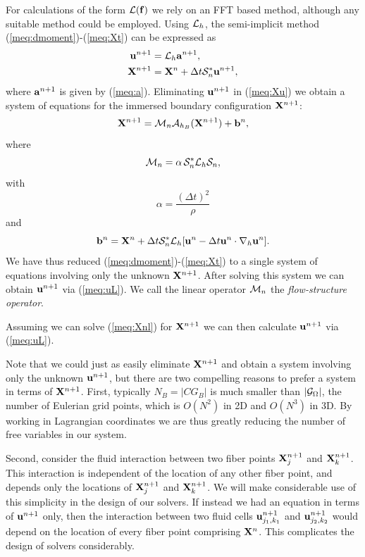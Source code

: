 For calculations of the form $\mathcal{L}(\mathbf{f})$ we rely on an FFT based method, although any suitable method could be employed.
Using $\mathcal{L}_h$,  the semi-implicit method  (\ref{meq:dmoment})-(\ref{meq:Xt})  can be expressed as
\begin{align}
\mathbf{u}^{n+1} &= \mathcal{L}_h \mathbf{a}^{n+1}, \label{meq:uL} \\
\mathbf{X}^{n+1}&=\mathbf{X}^n +\Delta t\mathcal{S}^*_n\mathbf{u}^{n+1}, \label{meq:Xu}
\end{align}
where $ \mathbf{a}^{n+1}$ is given by (\ref{meq:a}). Eliminating $\mathbf{u}^{n+1}$ in (\ref{meq:Xu}) we obtain  a system of equations for the immersed boundary configuration $\mathbf{X}^{n+1}$:
\begin{equation}
\mathbf{X}^{n+1} = \mathcal{M}_n\mathcal{A}_{h_B} (\mathbf{X}^{n+1}) + \mathbf{b}^n, \label{meq:Xnl}
\end{equation}
where 
\begin{equation}
 \mathcal{M}_n =  \alpha \,  \mathcal{S}^*_n \mathcal{L}_h \mathcal{S}_n,
\label{meq:M}
\end{equation}
with
\begin{equation}
\alpha = \frac{(\Delta t)^2}{\rho}
\end{equation}
and 
\begin{equation}
 \mathbf{b}^n = \mathbf{X}^n + \Delta t \mathcal{S}^*_n \mathcal{L}_h [\mathbf{u}^n-\Delta t \mathbf{u}^n \cdot
 \nabla_h \mathbf{u}^n]. \label{meq:bn}
\end{equation}
We have thus reduced (\ref{meq:dmoment})-(\ref{meq:Xt}) to a single system of  equations involving only the unknown $\mathbf{X}^{n+1}$. After solving this system we can obtain $\mathbf{u}^{n+1}$ via (\ref{meq:uL}). We call the linear operator $\mathcal{M}_n$ the {\em flow-structure operator}.

Assuming we can solve (\ref{meq:Xnl}) for $\mathbf{X}^{n+1}$ we can then calculate $\mathbf{u}^{n+1}$ via (\ref{meq:uL}).


Note that we could just as easily eliminate $\mathbf{X}^{n+1}$ and obtain a system involving only the unknown $\mathbf{u}^{n+1}$, but there are two compelling reasons to prefer a system in terms of $\mathbf{X}^{n+1}$. First, typically $N_B=|C{G}_B|$ is much smaller than $|\mathcal{G}_\Omega|$, the number of Eulerian grid points, which is $O(N^2)$ in 2D and $O(N^3)$ in 3D. By working in Lagrangian coordinates we are thus greatly reducing the number of free variables in our system.

Second, consider the fluid interaction between two fiber points $\mathbf{X}^{n+1}_j$ and $\mathbf{X}^{n+1}_k$. This interaction is independent of the location of any other fiber point, and depends only the locations of $\mathbf{X}^{n+1}_j$ and $\mathbf{X}^{n+1}_k$. We will make considerable use of this simplicity in the design of our solvers. If instead we had an equation in terms of $\mathbf{u}^{n+1}$ only, then the interaction between two fluid cells $\mathbf{u}^{n+1}_{j_1,k_1}$ and $\mathbf{u}^{n+1}_{j_2,k_2}$ would depend on the location of every fiber point comprising $\mathbf{X}^n$. This complicates the design of solvers considerably.


